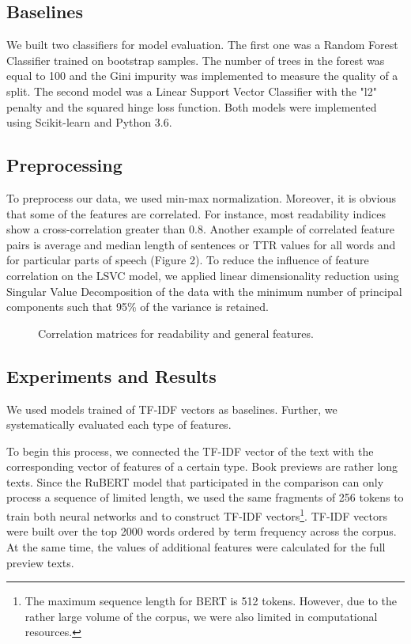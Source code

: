 \documentclass[runningheads]{llncs}
\begin{document}
\subsection{Baselines}

We built two classifiers for model evaluation. The first one was a Random Forest Classifier trained on bootstrap samples. The number of trees in the forest was equal to 100 and the Gini impurity was implemented to measure the quality of a split. The second model was a Linear Support Vector Classifier with the "l2" penalty and the squared hinge loss function. Both models were implemented using Scikit-learn \cite{Pedregosa} and Python 3.6.

\subsection{Preprocessing}

To preprocess our data, we used min-max normalization. Moreover, it is obvious that some of the features are correlated. For instance, most readability indices show a cross-correlation greater than 0.8. Another example of correlated feature pairs is average and median length of sentences or TTR values for all words and for particular parts of speech (Figure 2). To reduce the influence of feature correlation on the LSVC model, we applied linear dimensionality reduction using Singular Value Decomposition of the data with the minimum number of principal components such that 95\% of the variance is retained.

\begin{figure}[h]
\caption{Correlation matrices for readability and general features.}
\label{fig:image}
\end{figure}

\subsection{Experiments and Results}

We used models trained of TF-IDF vectors as baselines. Further, we systematically evaluated each type of features.

To begin this process, we connected the TF-IDF vector of the text with the corresponding vector of features of a certain type. Book previews are rather long texts. Since the RuBERT model that participated in the comparison can only process a sequence of limited length, we used the same fragments of 256 tokens to train both neural networks and to construct TF-IDF vectors\footnote{The maximum sequence length for BERT is 512 tokens. However, due to the rather large volume of the corpus, we were also limited in computational resources.}. TF-IDF vectors were built over the top 2000 words ordered by term frequency across the corpus. At the same time, the values of additional features were calculated for the full preview texts.
\end{document}
